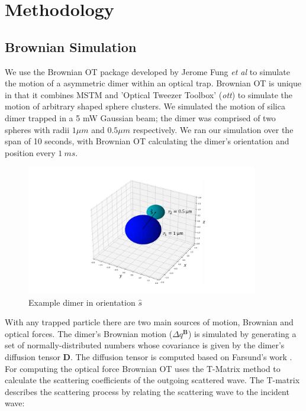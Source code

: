 \documentclass[final, 3p]{elsarticle}
\begin{document}
\section{Methodology}
\label{sec:Method}
\subsection{Brownian Simulation}
\label{sec:2.1}
We use the Brownian OT package developed by Jerome Fung \textit{et al} \cite{Vigilante2020Brownian_OT} to simulate the motion of a asymmetric dimer within an optical trap. Brownian OT is unique in that it combines MSTM \cite{Mishchenko1996MSTM} and 'Optical Tweezer Toolbox' (\textit{ott}) \cite{Lenton2020} to simulate the motion of arbitrary shaped sphere clusters. We simulated the motion of silica dimer trapped in a 5 mW Gaussian beam; the dimer was comprised of two spheres with radii $1\mu m$ and $ 0.5  \mu m$ respectively. We ran our simulation over the span of 10 seconds, with Brownian OT calculating the dimer's orientation and position every $1 \ ms$. 

\begin{figure}[h]
	\centering
	\includegraphics[width=0.9\textwidth]{./Images/Dimer.png}
	\caption{Example dimer in orientation $\hat{s}$}
	\label{fig:dimer}
\end{figure}

With any trapped particle there are two main sources of motion, Brownian and optical forces. The dimer's Brownian motion ($\Delta q^{\textbf{B}}$) is simulated by generating a set of normally-distributed numbers whose covariance is given by the dimer's diffusion tensor $\textbf{D}$. The diffusion tensor is computed based on Farsund's work \cite{Farsund1996}. For computing the optical force Brownian OT uses the T-Matrix method to calculate the scattering coefficients of the outgoing scattered wave. The T-matrix describes the scattering process by relating the scattering wave to the incident wave:
\end{document}
